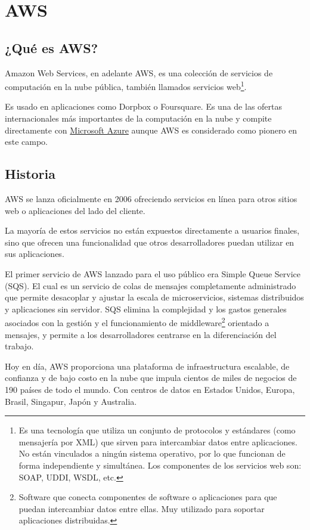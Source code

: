 \chapter{AWS}
\hypertarget{AWS}{}
\section{¿Qué es AWS?}
Amazon Web Services, en adelante AWS, es una colección de servicios de computación en la nube pública, también llamados servicios web\footnote{Es una tecnología que utiliza un conjunto de protocolos y estándares (como mensajería por XML) que sirven para intercambiar datos entre aplicaciones. No están vinculados a ningún sistema operativo, por lo que funcionan de forma independiente y simultánea. Los componentes de los servicios web son: SOAP, UDDI, WSDL, etc.}.

Es usado en aplicaciones como Dorpbox o Foursquare. Es una de las ofertas internacionales más importantes de la computación en la nube y compite directamente con \hyperlink{azure}{Microsoft Azure} aunque AWS es considerado como pionero en este campo.

\section{Historia}
AWS se lanza oficialmente en 2006 ofreciendo servicios en línea para otros sitios web o aplicaciones del lado del cliente.

La mayoría de estos servicios no están expuestos directamente a usuarios finales, sino que ofrecen una funcionalidad que otros desarrolladores puedan utilizar en sus aplicaciones.

El primer servicio de AWS lanzado para el uso público era Simple Queue Service (SQS). El cual es un servicio de colas de mensajes completamente administrado que permite desacoplar y ajustar la escala de microservicios, sistemas distribuidos y aplicaciones sin servidor. SQS elimina la complejidad y los gastos generales asociados con la gestión y el funcionamiento de middleware\footnote{Software que conecta componentes de software o aplicaciones para que puedan intercambiar datos entre ellas. Muy utilizado para soportar aplicaciones distribuidas.} orientado a mensajes, y permite a los desarrolladores centrarse en la diferenciación del trabajo.

Hoy en día, AWS proporciona una plataforma de infraestructura escalable, de confianza y de bajo costo en la nube que impula cientos de miles de negocios de 190 países de todo el mundo. Con centros de datos en Estados Unidos, Europa, Brasil, Singapur, Japón y Australia.

